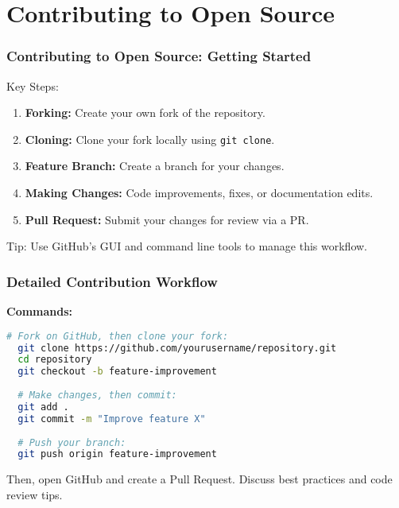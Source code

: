 \documentclass{beamer}
\begin{document}
\section{Contributing to Open Source}
\begin{frame}
	\frametitle{Contributing to Open Source: Getting Started}
	Key Steps:
	\begin{enumerate}
		\item \textbf{Forking:} Create your own fork of the repository.
		\item \textbf{Cloning:} Clone your fork locally using \texttt{git clone}.
		\item \textbf{Feature Branch:} Create a branch for your changes.
		\item \textbf{Making Changes:} Code improvements, fixes, or documentation edits.
		\item \textbf{Pull Request:} Submit your changes for review via a PR.
	\end{enumerate}
	\vfill
	\pause
	\alert{Tip:} Use GitHub’s GUI and command line tools to manage this workflow.
\end{frame}

\begin{frame}[fragile]
	\frametitle{Detailed Contribution Workflow}
	\textbf{Commands:}
	\begin{lstlisting}[language=bash]
  # Fork on GitHub, then clone your fork:
  git clone https://github.com/yourusername/repository.git
  cd repository
  git checkout -b feature-improvement
  
  # Make changes, then commit:
  git add .
  git commit -m "Improve feature X"
  
  # Push your branch:
  git push origin feature-improvement
  \end{lstlisting}
	\vfill
	Then, open GitHub and create a Pull Request. Discuss best practices and code review tips.
\end{frame}

\end{document}
